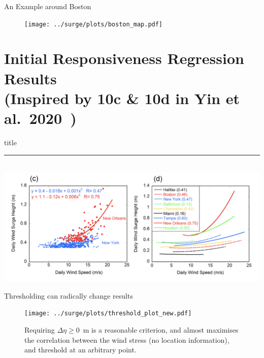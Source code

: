 \begin{frame}{An Example around Boston}
\vspace{-30pt}
\begin{figure}[htb!]
    \centering
    \texttt{[image: ../surge/plots/boston\_map.pdf]}
\end{figure}
\end{frame}


\section{Initial Responsiveness Regression Results\\
(Inspired by 10c \& 10d in Yin et al.~2020~\cite{ZannaPreprint})}
    \begin{frame}[plain]
        \vfill
      \centering
      \begin{beamercolorbox}[sep=8pt,center,shadow=true,rounded=true]{title}
        \insertsectionhead\par%
        \color{oxfordblue}\noindent\rule{10cm}{1pt} \\
        \includegraphics[width=1\linewidth]{images/example-images/yin-responsiveness.png}
      \end{beamercolorbox}
      \vfill
  \end{frame}

\begin{frame}{Thresholding can radically change results  }
\vspace{-20pt}
\begin{figure}[htb!]
    \centering
    \hspace{-10pt}
    \texttt{[image: ../surge/plots/threshold\_plot\_new.pdf]}
    \vspace{-7pt}
   \caption{Requiring  $\Delta \eta \ge 0$~m is a reasonable criterion,
    and almost maximises the correlation between the wind stress (no location information),
     and threshold at an arbitrary point.}
\end{figure}
\end{frame}

